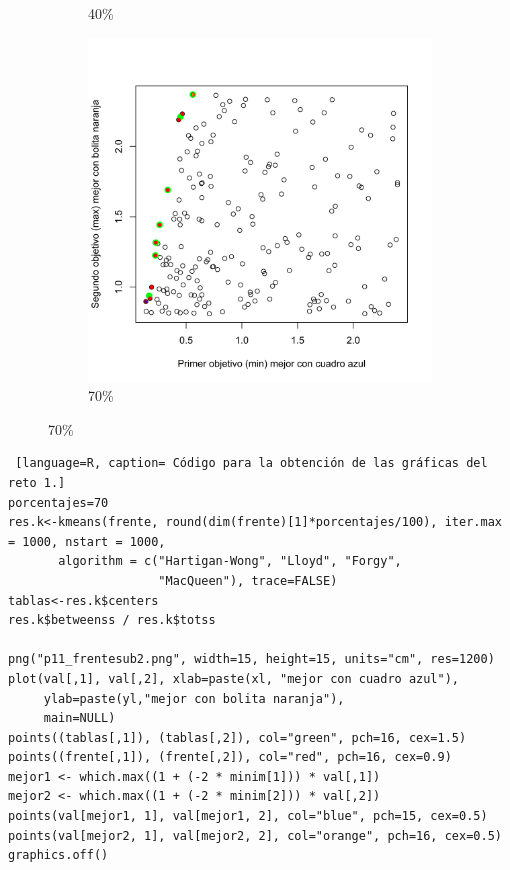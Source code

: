 \documentclass{article}
\begin{document}
\begin{figure}[h!]
\begin{subfigure}[b]{0.45\linewidth}
\caption{40\%}
\label{r140}
\end{subfigure}
\begin{subfigure}[b]{0.45\linewidth}
\includegraphics[width=\linewidth]{r170.png}
\caption{70\%}
\label{r170}
\end{subfigure}
\label{fig1}
\end{figure}

\begin{lstlisting} [language=R, caption= Código para la obtención de las gráficas del reto 1.]
porcentajes=70
res.k<-kmeans(frente, round(dim(frente)[1]*porcentajes/100), iter.max = 1000, nstart = 1000,
       algorithm = c("Hartigan-Wong", "Lloyd", "Forgy",
                     "MacQueen"), trace=FALSE)
tablas<-res.k$centers
res.k$betweenss / res.k$totss

png("p11_frentesub2.png", width=15, height=15, units="cm", res=1200)
plot(val[,1], val[,2], xlab=paste(xl, "mejor con cuadro azul"),
     ylab=paste(yl,"mejor con bolita naranja"),
     main=NULL)
points((tablas[,1]), (tablas[,2]), col="green", pch=16, cex=1.5)
points((frente[,1]), (frente[,2]), col="red", pch=16, cex=0.9)
mejor1 <- which.max((1 + (-2 * minim[1])) * val[,1])
mejor2 <- which.max((1 + (-2 * minim[2])) * val[,2])
points(val[mejor1, 1], val[mejor1, 2], col="blue", pch=15, cex=0.5)
points(val[mejor2, 1], val[mejor2, 2], col="orange", pch=16, cex=0.5)
graphics.off()
\end{lstlisting}
\end{document}
